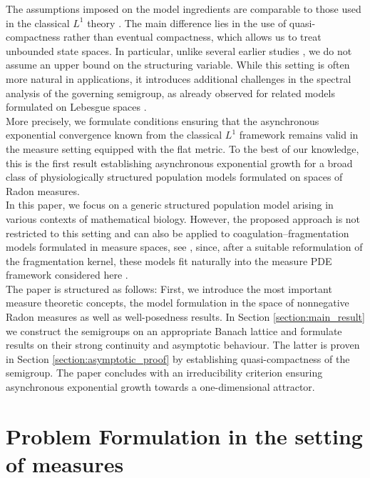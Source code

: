 \documentclass[12pt,a4paper]{amsart}
\begin{document}
The assumptions imposed on the model ingredients are comparable to those used in the classical $L^1$ theory \cite{KangShigui,Webb85,Webb1987}. The main difference lies in the use of quasi-compactness rather than eventual compactness, which allows us to treat unbounded state spaces. In particular, unlike several earlier studies \cite{AcklehFarkas,CDF,FarkasHinow}, we do not assume an upper bound on the structuring variable. While this setting is often more natural in applications, it introduces additional challenges in the spectral analysis of the governing semigroup, as already observed for related models formulated on Lebesgue spaces \cite{FarkasHagen}.\\
More precisely, we formulate conditions ensuring that the asynchronous exponential convergence known from the classical $L^1$ framework remains valid in the measure setting equipped with the flat metric. To the best of our knowledge, this is the first result establishing asynchronous exponential growth for a broad class of physiologically structured population models formulated on spaces of Radon measures.\\
In this paper, we focus on a generic structured population model arising in various contexts of mathematical biology. However, the proposed approach is not restricted to this setting and can also be applied to coagulation--fragmentation models formulated in measure spaces, see \cite{MR4330732}, since, after a suitable reformulation of the fragmentation kernel, these models fit naturally into the measure PDE framework considered here \cite[Section~5.3]{Duell_thesis}.
\\

\noindent The paper is structured as follows: First, we introduce the most important measure theoretic concepts, the model formulation in the space of nonnegative 
Radon measures as well as well-posedness results. In Section \ref{section:main_result} we  construct the semigroups on an appropriate Banach lattice and formulate results on their strong continuity and asymptotic behaviour. The latter is proven in Section \ref{section:asymptotic_proof} by establishing quasi-compactness of the semigroup. The paper concludes with an irreducibility criterion ensuring asynchronous exponential growth towards a one-dimensional attractor.


\section{Problem Formulation in the setting of measures}
\label{section:problem}
\end{document}
